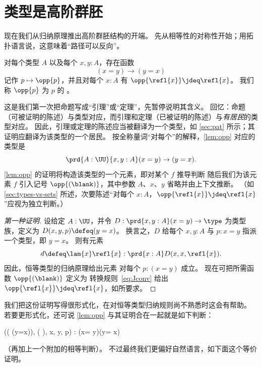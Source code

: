 \section{类型是高阶群胚}
\label{sec:equality}

%
%
%
现在我们从归纳原理推出高阶群胚结构的开端。
先从相等性的对称性开始；用拓扑语言说，这意味着“路径可以反向”。

\begin{lem}\label{lem:opp}
  对每个类型 $A$ 以及每个 $x,y:A$，存在函数
  \begin{equation*}
    (x= y)\to(y= x)
  \end{equation*}
  记作 $p\mapsto \opp{p}$，并且对每个 $x:A$ 有 $\opp{\refl{x}}\jdeq\refl{x}$。
  我们称 $\opp{p}$ 为 $p$ 的 。
\end{lem}

这是我们第一次把命题写成“引理”或“定理”，先暂停说明其含义。
回忆：命题（可被证明的陈述）与类型对应，而引理和定理（已被证明的陈述）与\emph{有居民}的类型对应。
因此，引理或定理的陈述应当被翻译为一个类型，如 \cref{sec:pat} 所示；其证明应翻译为该类型的一个居民。
按全称量词“对每个”的解释，\cref{lem:opp} 对应的类型是
\[ \prd{A:\UU}{x,y:A} (x= y)\to(y= x). \]
\cref{lem:opp} 的证明将构造该类型的一个元素，即对某个 $f$ 推导判断
随后我们为该元素 $f$ 引入记号 $\opp{(\blank)}$，其中参数 $A$、$x$、$y$ 省略并由上下文推断。
（如 \cref{sec:types-vs-sets} 所述，次要陈述“对每个 $x:A$，$\opp{\refl{x}}\jdeq\refl{x}$”应视为独立判断。）

\begin{proof}[第一种证明]
  设给定 $A:\UU$，并令 $D:\prd{x,y:A}(x= y) \to \type$ 为类型族，定义为 $D(x,y,p)\defeq (y= x)$。
  换言之，$D$ 给每个 $x,y:A$ 与 $p:x=y$ 指派一个类型，即 $y=x$。
  则有元素
  \begin{equation*}
    d\defeq \lam{x} \refl{x}:\prd{x:A} D(x,x,\refl{x}).
  \end{equation*}
  因此，恒等类型的归纳原理给出元素
  对每个 $p:(x= y)$ 成立。
  现在可把所需函数 $\opp{(\blank)}$ 定义为
  转换规则~\eqref{eq:Jconv} 给出 $\opp{\refl{x}}\jdeq \refl{x}$，如所要求。
\end{proof}

我们把这份证明写得很形式化，在对恒等类型归纳规则尚不熟悉时这会有帮助。
若要更形式化，还可说 \cref{lem:opp} 与其证明合在一起就是如下判断：
\begin{narrowmultline*}
   (( (y=x)), ( ), x, y, p)
  \narrowbreak :  (x= y)\to(y= x)
\end{narrowmultline*}
（再加上一个附加的相等判断）。
不过最终我们更偏好自然语言，如下面这个等价证明。

